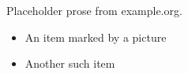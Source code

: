 \documentclass{article}
\begin{document}
Placeholder prose from example.org.

\begin{itemize}
\item An item marked by a picture
\item Another such item
\end{itemize}
\end{document}
